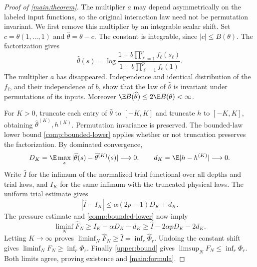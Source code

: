 \begin{proof}[Proof of \cref{main:theorem}]
The multiplier $a$ may depend asymmetrically on the labeled input functions,
so the original interaction law need not be permutation invariant.
We first remove this multiplier by an integrable scalar shift.
Set $c=\theta(1,\ldots,1)$ and $\widehat\theta=\theta-c$. The
constant is integrable, since $|c|\le B(\theta)$. The factorization gives
\[
 \widehat\theta(s)=
 \log\frac{1+b\prod_{\ell=1}^p f_\ell(s_\ell)}
 {1+b\prod_{\ell=1}^p f_\ell(1)}.
\]
The multiplier $a$ has disappeared. Independence and identical distribution
of the $f_\ell$, and their independence of $b$, show that the law of
$\widehat\theta$ is invariant under permutations of its inputs.
Moreover $\E B(\widehat\theta)\le2\E B(\theta)<\infty$.

For $K>0$, truncate each entry of $\widehat\theta$ to $[-K,K]$ and truncate
$h$ to $[-K,K]$, obtaining $\widehat\theta^{(K)},h^{(K)}$.
Permutation invariance is preserved. The bounded-law lower bound
\cref{comp:bounded-lower} applies whether or not truncation preserves the
factorization. By dominated convergence,
\[
 D_K=\E\max_s|\widehat\theta(s)-\widehat\theta^{(K)}(s)|\longrightarrow0,
 \qquad d_K=\E|h-h^{(K)}|\longrightarrow0.
\]
Write $\widehat I$ for the infimum of the normalized trial functional
over all depths and trial laws, and $I_K$ for the same infimum with
the truncated physical laws. The uniform trial estimate gives
\[
 |\widehat I-I_K|\le\alpha(2p-1)D_K+d_K.
\]
The pressure estimate and \cref{comp:bounded-lower} now imply
\[
 \liminf_N\widehat F_N
 \ge I_K-\alpha D_K-d_K
 \ge\widehat I-2\alpha pD_K-2d_K.
\]
Letting $K\to\infty$ proves
$\liminf_N\widehat F_N\ge\widehat I=\inf_r\widehat\Phi_r$.
Undoing the constant shift gives $\liminf_NF_N\ge\inf_r\Phi_r$.
Finally \cref{upper:bound} gives $\limsup_NF_N\le\inf_r\Phi_r$.
Both limits agree, proving existence and \eqref{main:formula}.
\end{proof}

